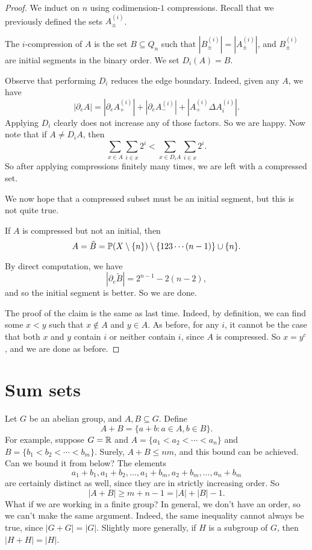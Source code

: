 \documentclass[a4paper]{article}
\begin{document}
\begin{proof}
  We induct on $n$ using codimension-$1$ compressions. Recall that we previously defined the sets $A_{\pm}^{(i)}$.

  The $i$-compression of $A$ is the set $B \subseteq Q_n$ such that $|B_{\pm}^{(i)}| = |A_{\pm}^{(i)}|$, and $B_{\pm}^{(i)}$ are initial segments in the binary order. We set $D_i(A) = B$.

  Observe that performing $D_i$ reduces the edge boundary. Indeed, given any $A$, we have
  \[
    |\partial_e A| = |\partial_e A_+^{(i)}| + |\partial_e A_-^{(i)}| + |A_+^{(i)} \Delta A_i^{(i)}|.
  \]
  Applying $D_i$ clearly does not increase any of those factors. So we are happy. Now note that if $A \not= D_i A$, then
  \[
    \sum_{x \in A} \sum_{i \in x} 2^i < \sum_{x \in D_i A} \sum_{i \in x} 2^i.
  \]
  So after applying compressions finitely many times, we are left with a compressed set.

  We now hope that a compressed subset must be an initial segment, but this is not quite true.
  \begin{claim}
    If $A$ is compressed but not an initial, then
    \[
      A = \tilde{B} = \P(X \setminus \{n\}) \setminus \{123\cdots (n-1)\} \cup \{n\}.
    \]
  \end{claim}
  By direct computation, we have
  \[
    |\partial_e \tilde{B}| = 2^{n - 1} - 2(n - 2),
  \]
  and so the initial segment is better. So we are done.

  The proof of the claim is the same as last time. Indeed, by definition, we can find some $x < y$ such that $x \not \in A$ and $y \in A$. As before, for any $i$, it cannot be the case that both $x$ and $y$ contain $i$ or neither contain $i$, since $A$ is compressed. So $x = y^c$, and we are done as before.
\end{proof}

\section{Sum sets}
Let $G$ be an abelian group, and $A, B \subseteq G$. Define
\[
  A + B = \{a + b: a \in A, b \in B\}.
\]
For example, suppose $G = \R$ and $A = \{a_1 < a_2 < \cdots < a_n\}$ and $B = \{b_1 < b_2 < \cdots < b_m\}$. Surely, $A + B \leq nm$, and this bound can be achieved. Can we bound it from below? The elements
\[
  a_1 + b_1, a_1 + b_2, \ldots, a_1 + b_m, a_2 + b_m, \ldots, a_n + b_m
\]
are certainly distinct as well, since they are in strictly increasing order. So
\[
  |A + B| \geq m + n - 1 = |A| + |B| - 1.
\]
What if we are working in a finite group? In general, we don't have an order, so we can't make the same argument. Indeed, the same inequality cannot always be true, since $|G + G| = |G|$. Slightly more generally, if $H$ is a subgroup of $G$, then $|H + H| = |H|$.
\end{document}
